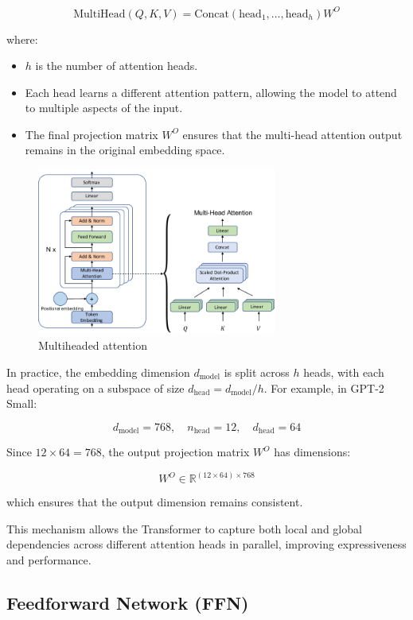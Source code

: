 \[
\text{MultiHead}(Q, K, V) = \text{Concat} \left( \text{head}_1, \dots, \text{head}_{h} \right) W^O
\]

where:
\begin{itemize}
    \item $h$ is the number of attention heads.
    \item Each head learns a different attention pattern, allowing the model to attend to multiple aspects of the input.
    \item The final projection matrix $W^O$ ensures that the multi-head attention output remains in the original embedding space.
\end{itemize}

\begin{figure}[H]
    \centering
    \includegraphics[width=0.7\textwidth]{img/chap03/Multiheaded.png} 
    \caption{Multiheaded attention}
    \label{fig:multi-head-attention}
\end{figure}

In practice, the embedding dimension $d_{\text{model}}$ is split across $h$ heads, with each head operating on a subspace of size $d_{\text{head}} = d_{\text{model}} / h$. For example, in GPT-2 Small:

\[
d_{\text{model}} = 768, \quad n_{\text{head}} = 12, \quad d_{\text{head}} = 64
\]

Since $12 \times 64 = 768$, the output projection matrix $W^O$ has dimensions:

\[
W^O \in \mathbb{R}^{(12 \times 64) \times 768}
\]

which ensures that the output dimension remains consistent.

This mechanism allows the Transformer to capture both local and global dependencies across different attention heads in parallel, improving expressiveness and performance.

\subsection{Feedforward Network (FFN)}

